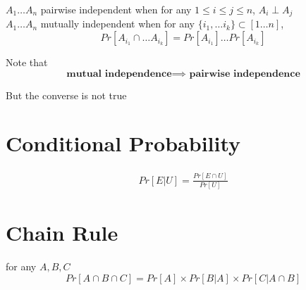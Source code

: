 \begin{framed}
   $A_1 \hdots A_n$ pairwise independent when for any $1 \leq i \leq j \leq n$,  $A_i \perp A_j$ \\

   $A_1 \hdots A_n$ mutually independent when for any $\{ i_1, \hdots i_k \} \subset [1 \hdots n]$, 
   \[
      Pr[A_{i_1} \cap \hdots A_{i_k} ] = Pr[A_{i_1}] \hdots Pr[A_{i_k}]
   \] 

   Note that 
   \[
     \textbf{mutual independence} \implies \textbf{ pairwise independence}
   \] 

   But the converse is not true
  
\end{framed}


\section{Conditional Probability}

\begin{framed}
   \begin{align*}
      Pr[E |U] = \frac{Pr[E \cap U]}{Pr[U]}
   \end{align*}
   
  
\end{framed}


\section{Chain Rule}

\begin{framed}
   for any $A, B, C$
   \[
      Pr[A \cap B \cap C] = Pr[A] \times Pr[B | A] \times Pr[C | A \cap B]
   \] 
  
\end{framed}

